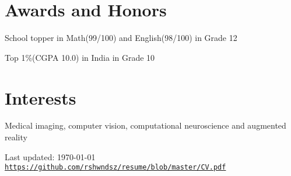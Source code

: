 \documentclass[letterpaper]{article}
\def\footerlink{https://github.com/rshwndsz/resume/blob/master/CV.pdf}
\renewenvironment{itemize}{
  \begin{list}{}{
    \setlength{\leftmargin}{1.5em}
  }
}{
  \end{list}
}
\begin{document}
\section*{Awards and Honors}
\begin{itemize}
  \item School topper in Math(99/100) and English(98/100) in Grade 12
  \item Top 1\%(CGPA 10.0) in India in Grade 10
\end{itemize}


\section*{Interests}
  \begin{itemize}
    \item Medical imaging, computer vision, computational neuroscience and augmented reality
  \end{itemize}


\bigskip
\begin{center}
  \begin{footnotesize}
    Last updated: \today \\
    \href{\footerlink}{\texttt{\footerlink}}
  \end{footnotesize}
\end{center}
\end{document}
